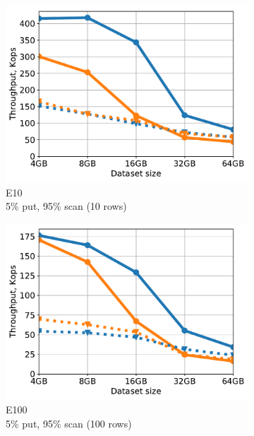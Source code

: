 \begin{figure}[tb]
\begin{subfigure}{0.33\linewidth}
\includegraphics[width=\textwidth]{figs/Workload_E-_line.pdf}
\caption{E10 \\ 5\% put, 95\% scan (10 rows)}
\label{fig:throughput:e10}
\end{subfigure}
\begin{subfigure}{0.33\linewidth}
\includegraphics[width=\textwidth]{figs/Workload_E_line.pdf}
\caption{E100 \\ 5\% put, 95\% scan (100 rows)}
\label{fig:throughput:e100}
\end{subfigure}
\begin{subfigure}{0.33\linewidth}

\end{subfigure}
\end{figure}
